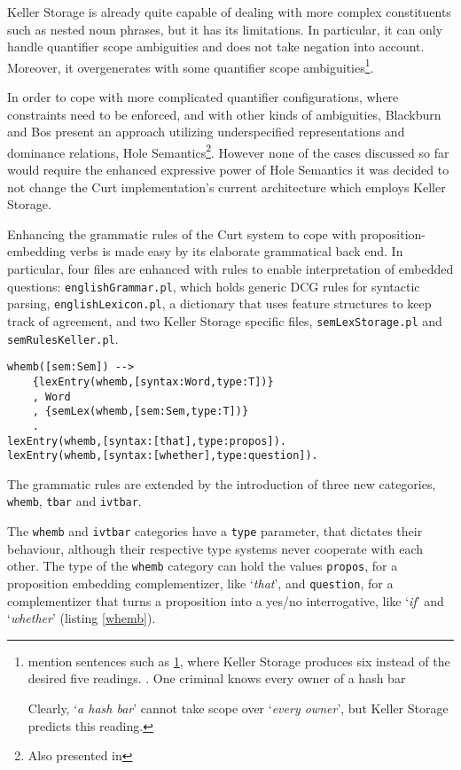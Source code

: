 \documentclass[notitlepage,twoside,a4paper]{scrreprt}
\newcommand{\abbr}{\textsf} %
\newcommand{\code}[1]{\texttt{#1}} %
\newcommand{\pn}{\textsf} %
\newcommand{\example}[1]{`\textit{#1}'} %
\newcommand{\curt}{\pn{Curt}}
\theoremstyle{remark}
\theoremstyle{remark}
\theoremstyle{definition}
\theoremstyle{definition}
\begin{document}
\pn{Keller Storage} is already quite capable
of dealing with more complex constituents such as nested noun phrases, but it
has its limitations. In particular, it can only handle quantifier scope
ambiguities and does not take negation into account. Moreover, it overgenerates
with some quantifier scope ambiguities\footnote{\cite{blackburnbos:cl1} mention
sentences such as \ref{ex:kellersucks}, where Keller Storage produces six
instead of the desired five readings.
\ex. One criminal knows every owner of a hash bar\label{ex:kellersucks}

Clearly, \example{a hash bar} cannot take scope over \example{every owner}, but
Keller Storage predicts this reading.}.

In order to cope with more complicated quantifier configurations, where
constraints need to be enforced, and with other kinds of ambiguities,
Blackburn and Bos present an approach utilizing underspecified representations and
dominance relations, \pn{Hole Semantics}\footnote{Also presented in %
}. 
However none of the cases discussed so far would require the enhanced
expressive power of \pn{Hole Semantics} it was decided to not change the \curt{}
implementation's current architecture which employs \pn{Keller Storage}.

Enhancing the grammatic rules of the \curt{} system to cope with
proposition-embedding verbs is made easy by its elaborate grammatical back
end. In particular, four files are enhanced with rules to enable interpretation
of embedded questions: \code{englishGrammar.pl}, which holds generic \abbr{DCG}
rules for syntactic parsing, \code{englishLexicon.pl}, a dictionary that uses
feature structures to keep track of agreement, and two \pn{Keller Storage}
specific files, \code{semLexStorage.pl} and \code{semRulesKeller.pl}.

\begin{lstlisting}[label=whemb,caption={Syntactic and Lexical Rules for Complementizers},float]
whemb([sem:Sem]) -->
    {lexEntry(whemb,[syntax:Word,type:T])}
    , Word
    , {semLex(whemb,[sem:Sem,type:T])}
    .
lexEntry(whemb,[syntax:[that],type:propos]).
lexEntry(whemb,[syntax:[whether],type:question]).
\end{lstlisting}

The grammatic rules are extended by the introduction of three new categories,
\code{whemb}, \code{tbar} and \code{ivtbar}.

The \code{whemb} and \code{ivtbar} categories have a \code{type} parameter, that dictates
their behaviour, although their respective type systems never cooperate with
each other. The type of the \code{whemb} category can hold the values
\code{propos}, for a proposition embedding complementizer, like \example{that},
and \code{question}, for a complementizer that turns a proposition into a yes/no
interrogative, like \example{if} and \example{whether} (listing \ref{whemb}).
\end{document}
